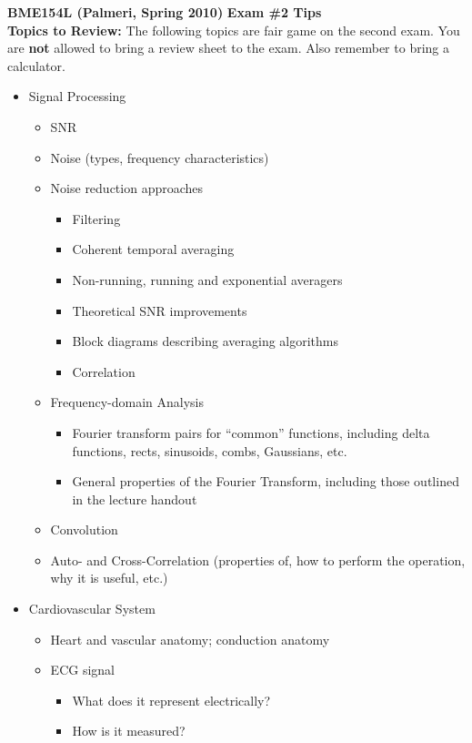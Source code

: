 \documentclass[11pt]{article}
\begin{document}
{\bf BME154L (Palmeri, Spring 2010)} \hfill
{\bf Exam \#2 Tips}\\


{\bf Topics to Review:} The following topics are fair game on the second exam.
You are {\bf not} allowed to bring a review sheet to the exam.  Also remember
to bring a calculator.

\begin{itemize}
\item Signal Processing
\begin{itemize}
    \item SNR
    \item Noise (types, frequency characteristics)
    \item Noise reduction approaches
    \begin{itemize}
        \item Filtering
        \item Coherent temporal averaging
        \item Non-running, running and exponential averagers
        \item Theoretical SNR improvements
        \item Block diagrams describing averaging algorithms
        \item Correlation
    \end{itemize}
    \item Frequency-domain Analysis
    \begin{itemize}
        \item Fourier transform pairs for ``common'' functions, including delta functions, rects, sinusoids, combs, Gaussians, etc.
        \item General properties of the Fourier Transform, including those outlined in the lecture handout
    \end{itemize}
    \item Convolution
    \item Auto- and Cross-Correlation (properties of, how to perform the operation, why it is useful, etc.)
\end{itemize}
\item Cardiovascular System
\begin{itemize}
    \item Heart and vascular anatomy; conduction anatomy
    \item ECG signal
    \begin{itemize}
        \item What does it represent electrically?
        \item How is it measured?

\end{itemize}
\end{itemize}
\end{itemize}
\end{document}

